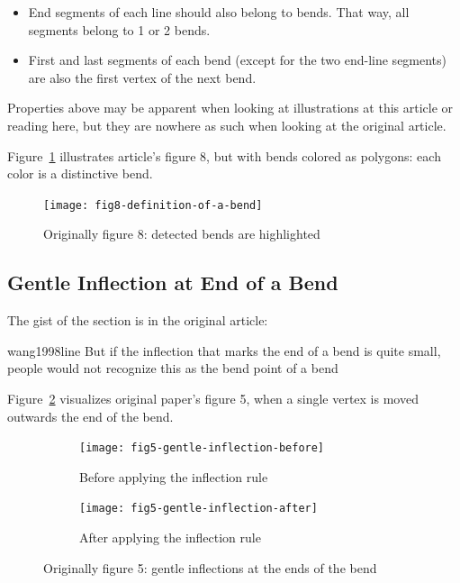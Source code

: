 \documentclass[a4paper]{article}
\begin{document}
\begin{itemize}
    \item End segments of each line should also belong to bends. That way, all
        segments belong to 1 or 2 bends.

    \item First and last segments of each bend (except for the two end-line
        segments) are also the first vertex of the next bend.
\end{itemize}

Properties above may be apparent when looking at illustrations at this article
or reading here, but they are nowhere as such when looking at the original
article.

Figure~\ref{fig:fig8-definition-of-a-bend} illustrates article's figure 8,
but with bends colored as polygons: each color is a distinctive bend.

\begin{figure}[h]
    \centering
    \texttt{[image: fig8-definition-of-a-bend]}
    \caption{Originally figure 8: detected bends are highlighted}
    \label{fig:fig8-definition-of-a-bend}
\end{figure}

\subsection{Gentle Inflection at End of a Bend}

The gist of the section is in the original article:

\begin{displaycquote}{wang1998line}
    But if the inflection that marks the end of a bend is quite small, people
    would not recognize this as the bend point of a bend
\end{displaycquote}

Figure~\ref{fig:fig5-gentle-inflection} visualizes original paper's figure 5,
when a single vertex is moved outwards the end of the bend.

\begin{figure}[h]
    \centering
    \begin{subfigure}[b]{.49\textwidth}
        \texttt{[image: fig5-gentle-inflection-before]}
        \caption{Before applying the inflection rule}
    \end{subfigure}
    \hfill
    \begin{subfigure}[b]{.49\textwidth}
        \texttt{[image: fig5-gentle-inflection-after]}
        \caption{After applying the inflection rule}
    \end{subfigure}
    \caption{Originally figure 5: gentle inflections at the ends of the bend}
    \label{fig:fig5-gentle-inflection}
\end{figure}
\end{document}

